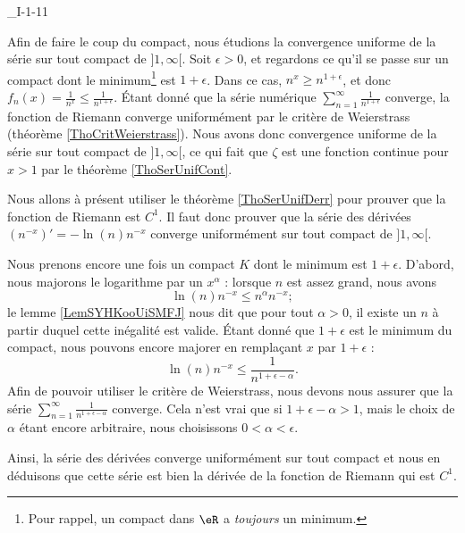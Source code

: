 

\begin{corrige}{_I-1-11}

Afin de faire le coup du compact, nous étudions la convergence uniforme de la série sur tout compact de $]1,\infty[$. Soit $\epsilon>0$, et regardons ce qu'il se passe sur un compact dont le minimum\footnote{Pour rappel, un compact dans $\eR$ a \emph{toujours} un minimum.} est $1+\epsilon$. Dans ce cas, $n^x\geq n^{1+\epsilon}$, et donc $f_n(x)=\frac{ 1 }{ n^x }\leq \frac{1}{ n^{1+\epsilon} }$. Étant donné que la série numérique $\sum_{n=1}^{\infty}\frac{1}{ n^{1+\epsilon} }$ converge, la fonction de Riemann converge uniformément par le critère de Weierstrass (théorème \ref{ThoCritWeierstrass}). Nous avons donc convergence uniforme de la série sur tout compact de $]1,\infty[$, ce qui fait que $\zeta$ est une fonction continue pour $x>1$ par le théorème \ref{ThoSerUnifCont}.

Nous allons à présent utiliser le théorème \ref{ThoSerUnifDerr} pour prouver que la fonction de Riemann est $C^1$. Il faut donc prouver que la série des dérivées $(n^{-x})'=-\ln(n)n^{-x}$ converge uniformément sur tout compact de $]1,\infty[$.

Nous prenons encore une fois un compact $K$ dont le minimum est $1+\epsilon$. D'abord, nous majorons le logarithme par un $x^{\alpha}$ : lorsque $n$ est assez grand, nous avons
\begin{equation}
	\ln(n)n^{-x}\leq n^{\alpha}n^{-x};
\end{equation}
le lemme \ref{LemSYHKooUiSMFJ} nous dit que pour tout $\alpha>0$, il existe un $n$ à partir duquel cette inégalité est valide. Étant donné que $1+\epsilon$ est le minimum du compact, nous pouvons encore majorer en remplaçant $x$ par $1+\epsilon$ :
\begin{equation}
	\ln(n)n^{-x}\leq \frac{1}{ n^{1+\epsilon-\alpha} }.
\end{equation}
Afin de pouvoir utiliser le critère de Weierstrass, nous devons nous assurer que la série $\sum_{n=1}^{\infty} \frac{ 1 }{ n^{1+\epsilon-\alpha} } $ converge. Cela n'est vrai que si $1+\epsilon-\alpha > 1$, mais le choix de $\alpha$ étant encore arbitraire, nous choisissons $0<\alpha<\epsilon$.

Ainsi, la série des dérivées converge uniformément sur tout compact et nous en déduisons que cette série est bien la dérivée de la fonction de Riemann qui est $C^1$.


\end{corrige}
